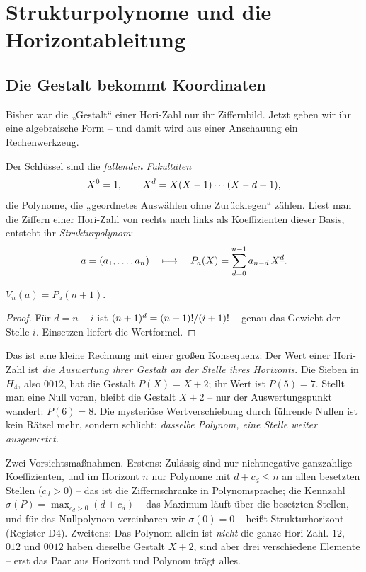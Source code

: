 \chapter{Strukturpolynome und die Horizontableitung}
\label{ch:strukturpolynome}


\section{Die Gestalt bekommt Koordinaten}

Bisher war die „Gestalt“ einer Hori-Zahl nur ihr Ziffernbild.
Jetzt geben wir ihr eine algebraische Form -- und damit wird aus
einer Anschauung ein Rechenwerkzeug.

Der Schlüssel sind die \emph{fallenden Fakultäten}
\[
X^{\underline{0}}=1,\qquad X^{\underline{d}}=X(X-1)\cdots(X-d+1),
\]
die Polynome, die „geordnetes Auswählen ohne Zurücklegen“ zählen.
Liest man die Ziffern einer Hori-Zahl von rechts nach links als
Koeffizienten dieser Basis, entsteht ihr \emph{Strukturpolynom}:
\[
a=(a_1,\ldots,a_n)
\quad\longmapsto\quad
P_a(X)=\sum_{d=0}^{n-1}a_{n-d}\,X^{\underline{d}} .
\]

\begin{satz}
$V_n(a)=P_a(n+1)$.
\end{satz}

\begin{proof}
Für $d=n-i$ ist $(n+1)^{\underline{d}}=(n+1)!/(i+1)!$ -- genau das Gewicht
der Stelle $i$. Einsetzen liefert die Wertformel.
\end{proof}

Das ist eine kleine Rechnung mit einer großen Konsequenz: Der Wert
einer Hori-Zahl ist \emph{die Auswertung ihrer Gestalt an der Stelle
ihres Horizonts}. Die Sieben in $H_4$, also $0012$, hat die Gestalt
$P(X)=X+2$; ihr Wert ist $P(5)=7$. Stellt man eine Null voran,
bleibt die Gestalt $X+2$ -- nur der Auswertungspunkt wandert:
$P(6)=8$. Die mysteriöse Wertverschiebung durch führende Nullen ist
kein Rätsel mehr, sondern schlicht: \emph{dasselbe Polynom, eine
Stelle weiter ausgewertet.}

Zwei Vorsichtsmaßnahmen. Erstens: Zulässig sind nur nichtnegative
ganzzahlige Koeffizienten, und im Horizont $n$ nur Polynome mit
$d+c_d\le n$ an allen besetzten Stellen ($c_d>0$) --
das ist die Ziffernschranke in Polynomsprache; die Kennzahl
$\sigma(P)=\max_{c_d>0}(d+c_d)$ -- das Maximum läuft über die
besetzten Stellen, und für das Nullpolynom vereinbaren wir
$\sigma(0)=0$ -- heißt Strukturhorizont (Register D4).
Zweitens: Das Polynom allein ist \emph{nicht} die ganze Hori-Zahl.
$12$, $012$ und $0012$ haben dieselbe Gestalt $X+2$, sind aber drei
verschiedene Elemente -- erst das Paar aus Horizont und Polynom
trägt alles.

